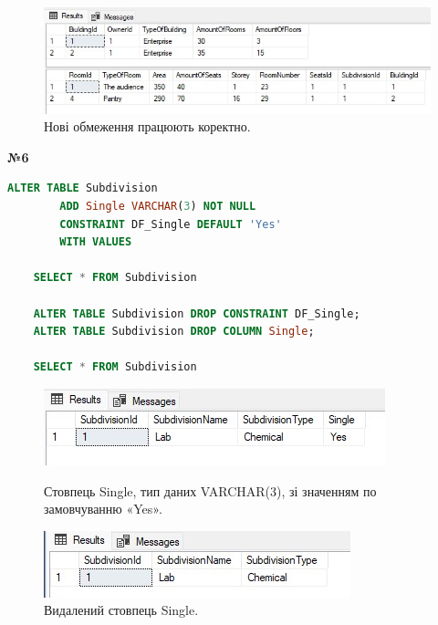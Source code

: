 \documentclass[a4paper,12pt]{article}
\begin{document}
\newpage
	\begin{figure}[h!]
		\centering
		\begin{minipage}[h]{1.05\linewidth}
			\includegraphics[width=1\linewidth]{Prt sc/Figure_4.jpg}  
		\end{minipage}
		\caption{Нові обмеження працюють коректно.}
	\end{figure}
	
	\begin{center}
		\textbf{№6}
	\end{center}
	\begin{lstlisting}[language=SQL]
	ALTER TABLE Subdivision
		ADD Single VARCHAR(3) NOT NULL 
		CONSTRAINT DF_Single DEFAULT 'Yes'
		WITH VALUES
	
	SELECT * FROM Subdivision
	
	ALTER TABLE Subdivision DROP CONSTRAINT DF_Single;
	ALTER TABLE Subdivision DROP COLUMN Single;
	
	SELECT * FROM Subdivision
	\end{lstlisting}
	\begin{figure}[h!]
		\centering
		\begin{minipage}[h]{0.9\linewidth}
			\includegraphics[width=1\linewidth]{Prt sc/Figure_5.jpg}  
		\end{minipage}
		\caption{Стовпець Single, тип даних VARCHAR(3), зі значенням по замовчуванню «Yes».}
		\begin{minipage}[h]{0.9\linewidth}
			\includegraphics[width=1\linewidth]{Prt sc/Figure_6.jpg}  
		\end{minipage}
		\caption{Видалений стовпець Single.}
	\end{figure}
	
\end{document}
